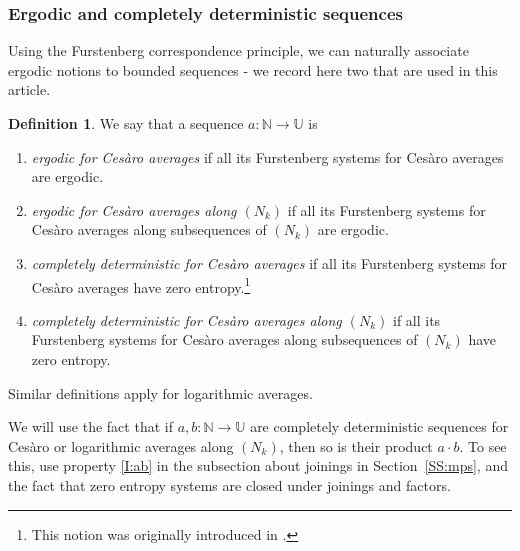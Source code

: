 \documentclass[11pt]{amsart}
\theoremstyle{definition}
\newtheorem{definition}{Definition}[section]
\newcommand{\N}{{\mathbb N}}
\newcommand{\U}{{\mathbb U}}
\begin{document}
\subsubsection{Ergodic and completely deterministic sequences}
Using the  Furstenberg correspondence principle, we can naturally associate ergodic notions to bounded sequences -
we record here two that are used in this article.
\begin{definition}\label{D:ergodicnotions}
	We say that a  sequence   $a\colon \N\to \U$ is
	\begin{enumerate}
			\item {\em ergodic for Ces\`aro averages}  if
		all its Furstenberg systems for Ces\`aro averages are ergodic.
		
		\smallskip
		
		\item {\em ergodic for Ces\`aro averages along $(N_k)$} if
		all its Furstenberg systems for Ces\`aro averages along subsequences of $(N_k)$ are ergodic.
		
			\item  {\em   completely deterministic for Ces\`aro averages}  if
		all its Furstenberg systems for Ces\`aro averages  have zero entropy.\footnote{This notion was originally introduced in \cite{Ka,We}.}
		
		\item  {\em  completely deterministic for Ces\`aro averages along $(N_k)$}  if
			all its Furstenberg systems for Ces\`aro averages along subsequences of $(N_k)$ have zero entropy.
	\end{enumerate}
	Similar definitions apply for logarithmic averages.
\end{definition}
We will use the fact that if $a,b\colon \N\to \U$ are completely deterministic sequences for Ces\`aro or logarithmic averages along $(N_k)$, then so is their product $a\cdot b$.
To see this, use property \eqref{I:ab} in the subsection about joinings in Section~\ref{SS:mps}, and the fact that zero entropy systems are closed under joinings and factors.
\end{document}
